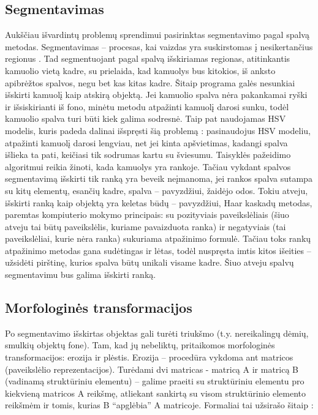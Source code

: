 \documentclass{VUMIFPSkursinis}
\begin{document}
\subsection{Segmentavimas}
Aukščiau išvardintų problemų sprendimui pasirinktas segmentavimo pagal spalvą metodas. Segmentavimas – procesas, kai vaizdas yra suskirstomas į nesikertančius regionus \cite{ImageSegmTech}. Tad segmentuojant pagal spalvą išskiriamas regionas, atitinkantis kamuolio vietą kadre, su prielaida, kad kamuolys bus kitokios, iš anksto apibrėžtos spalvos, negu bet kas kitas kadre. Šitaip programa galės nesunkiai išskirti kamuolį kaip atskirą objektą. 
Jei kamuolio spalva nėra pakankamai ryški ir išsiskirianti iš fono, minėtu metodu atpažinti kamuolį darosi sunku, todėl kamuolio spalva turi būti kiek galima sodresnė. Taip pat naudojamas HSV modelis, kuris padeda dalinai išspręsti šią problemą \cite{StaloTenisas}: pasinaudojus HSV modeliu, atpažinti kamuolį darosi lengviau, net jei kinta apšvietimas, kadangi spalva išlieka ta pati, keičiasi tik sodrumas kartu su šviesumu.
Taisyklės pažeidimo algoritmui reikia žinoti, kada kamuolys yra rankoje. Tačiau vykdant spalvos segmentavimą išskirti tik ranką yra beveik neįmanoma, jei rankos spalva sutampa su kitų elementų, esančių kadre, spalva – pavyzdžiui, žaidėjo odos. Tokiu atveju, išskirti ranką kaip objektą yra keletas būdų – pavyzdžiui, Haar kaskadų metodas, paremtas kompiuterio mokymo principais: su pozityviais paveikslėliais (šiuo atveju tai būtų paveikslėlis, kuriame pavaizduota ranka) ir negatyviais (tai paveikslėliai, kurie nėra ranka) sukuriama atpažinimo formulė. \cite{HaarCascades}  Tačiau toks rankų atpažinimo metodas gana sudėtingas ir lėtas, todėl nuspręsta imtis kitos išeities – užsidėti pirštinę, kurios spalva būtų unikali visame kadre. Šiuo atveju spalvų segmentavimu bus galima išskirti ranką.
\subsection{Morfologinės transformacijos}
Po segmentavimo išskirtas objektas gali turėti triukšmo (t.y. nereikalingų dėmių, smulkių objektų fone). Tam, kad jų nebeliktų, pritaikomos morfologinės transformacijos: erozija ir plėstis. Erozija – procedūra vykdoma ant matricos (paveikslėlio reprezentacijos). Turėdami dvi matricas -  matricą A ir matricą B (vadinamą struktūriniu elementu) – galime praeiti su struktūriniu elementu pro kiekvieną matricos A reikšmę, atliekant sankirtą su visom struktūrinio elemento reikšmėm ir tomis, kurias B “apglėbia” A matricoje. Formaliai tai užsirašo šitaip \cite{ImageAnalysisMorph}:
\end{document}
